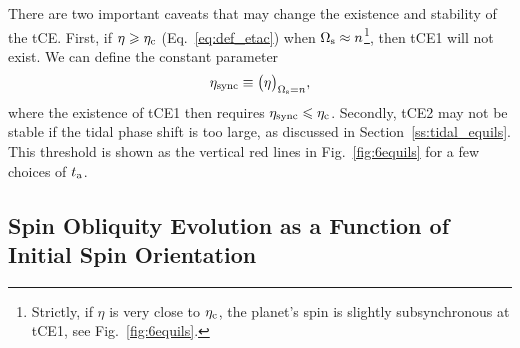 \documentclass[
        fleqn,
        usenatbib,
    ]{mnras}
\begin{document}
There are two important caveats that may change the existence and stability of
the tCE\@. First, if $\eta \geq \eta_{\rm c}$ (Eq.~\eqref{eq:def_etac}) when
$\Omega_{\rm s} \approx n$\footnote{Strictly, if $\eta$ is very close to
$\eta_{\rm c}$, the planet's spin is slightly subsynchronous at tCE1, see
Fig.~\ref{fig:6equils}.}, then tCE1 will not exist. We can define the constant
parameter
\begin{equation}
    \eta_{\rm sync} \equiv \big(\eta\big)_{\Omega_{\rm s} = n},
        \label{eq:def_etasync}
\end{equation}
where the existence of tCE1 then requires $\eta_{\rm sync} \leq \eta_{\rm
c}$. Secondly, tCE2 may not be stable if the tidal phase shift is too large, as
discussed in Section~\ref{ss:tidal_equils}. This threshold is shown as the
vertical red lines in Fig.~\ref{fig:6equils} for a few choices of $t_{\rm a}$.

\subsection{Spin Obliquity Evolution as a Function of Initial Spin Orientation}
\end{document}
